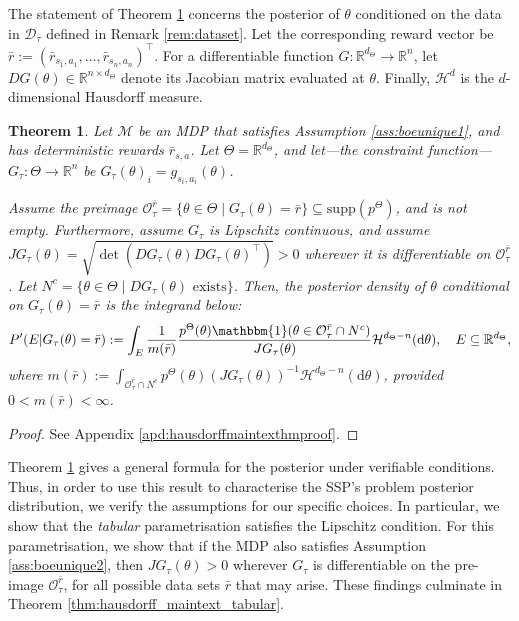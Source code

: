 \documentclass{amsart}
\newtheorem{theorem}{Theorem}[]
\begin{document}
The statement of Theorem \ref{thm:hausdorff_maintext} concerns the posterior of $\theta$ conditioned on the data in $\mathcal{D}_\tau$ defined in Remark \ref{rem:dataset}. Let the corresponding reward vector be $\bar{r}:=(\bar{r}_{s_1,a_1},\dots,\bar{r}_{s_n,a_n})^\top$. For a differentiable function $G:\mathbb{R}^{d_\Theta}\rightarrow \mathbb{R}^n$, let $DG(\theta) \in \mathbb{R}^{n \times d_\Theta}$ denote its Jacobian matrix evaluated at $\theta$. Finally, $\mathcal{H}^{d}$ is the $d$-dimensional Hausdorff measure.
\begin{theorem}\label{thm:hausdorff_maintext}
Let $\mathcal{M}$ be an MDP that satisfies Assumption \ref{ass:boeunique1}, and has deterministic rewards $\bar{r}_{s,a}$. Let $\Theta =\mathbb{R}^{d_\Theta}$, and let---the constraint function---$G_\tau:\Theta\rightarrow \mathbb{R}^n$ be $G_\tau(\theta)_i=g_{s_i,a_i}(\theta)$. 

Assume the preimage $\mathcal{O}^{\bar{r}}_\tau = \{\theta \in \Theta \mid G_\tau(\theta)=\bar{r}\} \subseteq \text{supp}(p^\Theta)$, and is not empty. Furthermore, 
assume $G_\tau$ is Lipschitz continuous, and assume $JG_\tau(\theta)=\sqrt{\det(DG_\tau(\theta) DG_\tau(\theta)^\top)} > 0$ wherever it is differentiable on $\mathcal{O}_\tau^{\bar{r}}$. Let $N^c=\{\theta \in \Theta \mid  DG_\tau(\theta) \text{ exists}\}$. Then, the posterior density of $\theta$ conditional on $G_\tau(\theta)=\bar{r}$ is the integrand below:
\begin{equation}\label{eqn:hausdorff}
     P^\prime(E|G_\tau(\theta)=\bar{r}) :=  \int_{E} \frac{1}{m(\bar{r})} \frac{p^\Theta(\theta) \mathbbm{1}(\theta \in \mathcal{O}_\tau^{\bar{r}}\cap N^c)}{ JG_\tau(\theta)} \mathcal{H}^{d_\Theta - n}(\mathrm{d}\theta),\quad E \subseteq \mathbb{R}^{d_\Theta}, 
\end{equation}
where $m(\bar{r}):=\int_{\mathcal{O}_\tau^{\bar{r}}\cap N^c} p^\Theta(\theta)(JG_\tau (\theta))^{-1} \mathcal{H}^{d_\Theta-n}(\mathrm{d}\theta)$,
provided $0<m(\bar{r}) < \infty$.
\end{theorem}
\begin{proof}
    See Appendix \ref{apd:hausdorffmaintexthmproof}.
\end{proof}

 Theorem \ref{thm:hausdorff_maintext} gives a general formula for the posterior under verifiable conditions. Thus, in order to use this result to characterise the SSP's problem posterior distribution, we verify the assumptions for our specific choices. In particular, we show that the {\it tabular} parametrisation satisfies the Lipschitz condition. For this parametrisation, we show that if the MDP also satisfies Assumption \ref{ass:boeunique2}, then $JG_\tau(\theta)>0$ wherever $G_\tau$ is differentiable on the pre-image $\mathcal{O}_\tau^{\bar{r}}$, for all possible data sets $\bar{r}$ that may arise. These findings culminate in Theorem \ref{thm:hausdorff_maintext_tabular}.
\end{document}
